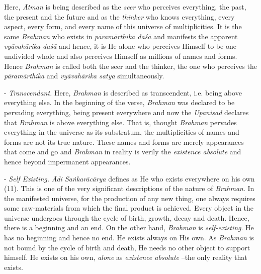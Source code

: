 Here, \emph{Ātman} is being described as the \emph{seer} who perceives everything, the past, the present and the future and as the \emph{thinker} who knows everything, every aspect, every form, and every name of this universe of multiplicities. It is the same \emph{Brahman} who exists in \emph{pāramārthika daśā} and manifests the apparent \emph{vyāvahārika daśā} and hence, it is He alone who perceives Himself to be one undivided whole and also perceives Himself as millions of names and forms. Hence \emph{Brahman} is called both the seer and the thinker, the one who perceives the \emph{pāramārthika} and \emph{vyāvahārika satya} simultaneously.

- \emph{Transcendant.} Here, \emph{Brahman} is described as transcendent, i.e. being above everything else. In the beginning of the verse, \emph{Brahman} was declared to be pervading everything, being present everywhere and now the \emph{Upaniṣad} declares that \emph{Brahman} is above everything else. That is, thought \emph{Brahman} pervades everything in the universe as its substratum, the multiplicities of names and forms are not its true nature. These names and forms are merely appearances that come and go and \emph{Brahman} in reality is verily the \emph{existence absolute} and hence beyond impermanent appearances.

- \emph{Self Existing.} \emph{Ādi Saṅkarācārya} defines  as He who exists everywhere on his own (11). This is one of the very significant descriptions of the nature of \emph{Brahman}. In the manifested universe, for the production of any new thing, one always requires some raw-materials from which the final product is achieved. Every object in the universe undergoes through the cycle of birth, growth, decay and death. Hence, there is a beginning and an end. On the other hand, \emph{Brahman} is \emph{self-existing}. He has no beginning and hence no end. He exists always on His own. As \emph{Brahman} is not bound by the cycle of birth and death, He needs no other object to support himself. He exists on his own, \emph{alone} as \emph{existence absolute} --the only reality that exists.


